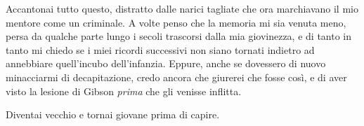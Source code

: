 Accantonai tutto questo, distratto dalle narici tagliate che ora
marchiavano il mio mentore come un criminale. A volte penso che la
memoria mi sia venuta meno, persa da qualche parte lungo i secoli
trascorsi dalla mia giovinezza, e di tanto in tanto mi chiedo se i miei
ricordi successivi non siano tornati indietro ad annebbiare quell'incubo
dell'infanzia. Eppure, anche se dovessero di nuovo minacciarmi di
decapitazione, credo ancora che giurerei che fosse così, e di aver visto
la lesione di Gibson \emph{prima} che gli venisse inflitta.

Diventai vecchio e tornai giovane prima di capire.
